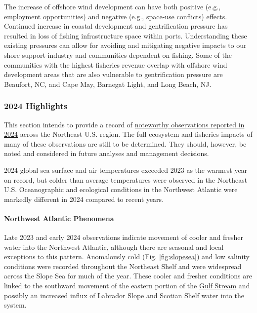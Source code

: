 \documentclass[
  10pt,
]{article}
\begin{document}
The increase of offshore wind development can have both positive (e.g., employment opportunities) and negative (e.g., space-use conflicts) effects. Continued increase in coastal development and gentrification pressure has resulted in loss of fishing infrastructure space within ports. Understanding these existing pressures can allow for avoiding and mitigating negative impacts to our shore support industry and communities dependent on fishing. Some of the communities with the highest fisheries revenue overlap with offshore wind development areas that are also vulnerable to gentrification pressure are Beaufort, NC, and Cape May, Barnegat Light, and Long Beach, NJ.

\newpage

\subsubsection{2024 Highlights}\label{highlights}

This section intends to provide a record of \href{https://noaa-edab.github.io/catalog/observation_synthesis_2024.html}{noteworthy observations reported in 2024} across the Northeast U.S. region. The full ecosystem and fisheries impacts of many of these observations are still to be determined. They should, however, be noted and considered in future analyses and management decisions.

2024 global sea surface and air temperatures exceeded 2023 as the warmest year on record, but colder than average temperatures were observed in the Northeast U.S. Oceanographic and ecological conditions in the Northwest Atlantic were markedly different in 2024 compared to recent years.

\paragraph{Northwest Atlantic Phenomena}\label{northwest-atlantic-phenomena}

Late 2023 and early 2024 observations indicate movement of cooler and fresher water into the Northwest Atlantic, although there are seasonal and local exceptions to this pattern. Anomalously cold (Fig. \ref{fig:slopesea}) and low salinity conditions were recorded throughout the Northeast Shelf and were widespread across the Slope Sea for much of the year. These cooler and fresher conditions are linked to the southward movement of the eastern portion of the \href{https://noaa-edab.github.io/catalog/gsi.html}{Gulf Stream} and possibly an increased influx of Labrador Slope and Scotian Shelf water into the system.
\end{document}
